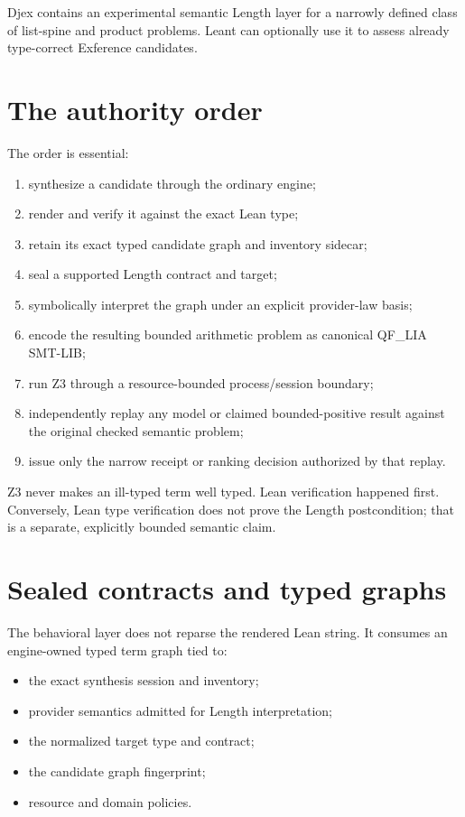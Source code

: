 \documentclass[10pt,letterpaper,oneside,openany]{report}
\begin{document}
Djex contains an experimental semantic Length layer for a narrowly defined class of list-spine and product problems.  Leant can optionally use it to assess already type-correct Exference candidates.

\section{The authority order}

The order is essential:

\begin{enumerate}
\item synthesize a candidate through the ordinary engine;
\item render and verify it against the exact Lean type;
\item retain its exact typed candidate graph and inventory sidecar;
\item seal a supported Length contract and target;
\item symbolically interpret the graph under an explicit provider-law basis;
\item encode the resulting bounded arithmetic problem as canonical QF\_LIA SMT-LIB;
\item run Z3 through a resource-bounded process/session boundary;
\item independently replay any model or claimed bounded-positive result against the original checked semantic problem;
\item issue only the narrow receipt or ranking decision authorized by that replay.
\end{enumerate}

Z3 never makes an ill-typed term well typed.  Lean verification happened first.  Conversely, Lean type verification does not prove the Length postcondition; that is a separate, explicitly bounded semantic claim.

\section{Sealed contracts and typed graphs}

The behavioral layer does not reparse the rendered Lean string.  It consumes an engine-owned typed term graph tied to:

\begin{itemize}
\item the exact synthesis session and inventory;
\item provider semantics admitted for Length interpretation;
\item the normalized target type and contract;
\item the candidate graph fingerprint;
\item resource and domain policies.
\end{itemize}
\end{document}
